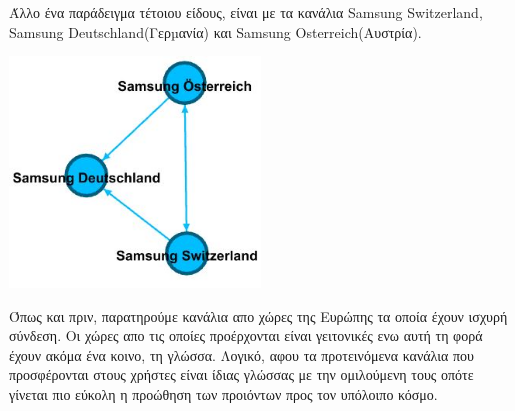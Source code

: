 \documentclass[12pt]{article}
\begin{document}
	Άλλο ένα παράδειγμα τέτοιου είδους, είναι με τα κανάλια Samsung Switzerland, Samsung Deutschland(Γερµανία) και Samsung Osterreich(Αυστρία).
	\begin{center}
		\includegraphics[width=0.5\textwidth]{photos-files/section10/comm2.jpg}
	\end{center}
	Όπως και πριν, παρατηρούμε κανάλια απο χώρες της Ευρώπης τα οποία έχουν ισχυρή σύνδεση. Οι χώρες απο τις οποίες προέρχονται είναι γειτονικές ενω αυτή τη φορά έχουν ακόμα ένα κοινο, τη γλώσσα. Λογικό, αφου τα προτεινόμενα κανάλια που προσφέρονται στους χρήστες είναι ίδιας γλώσσας με την ομιλούμενη τους οπότε γίνεται πιο εύκολη η προώθηση των προιόντων προς τον υπόλοιπο κόσμο.	
	\label{chap:gender_and_homophily_10}
	
		
	\newpage
\end{document}
